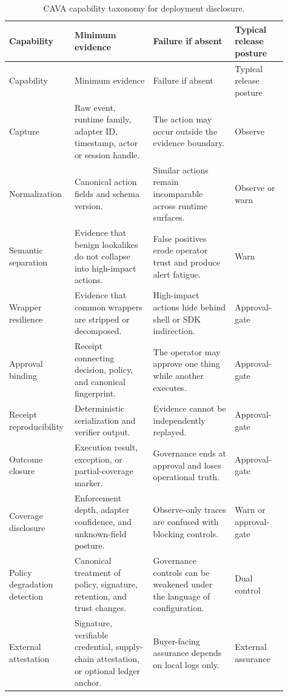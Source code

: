 \documentclass[11pt]{article}
\begin{document}
\begin{longtable}{@{}L{0.18\linewidth}L{0.27\linewidth}L{0.28\linewidth}L{0.18\linewidth}@{}}
\caption{CAVA capability taxonomy for deployment disclosure.}
\label{tab:capability-taxonomy}\\
\toprule
Capability & Minimum evidence & Failure if absent & Typical release posture \\
\midrule
\endfirsthead
\toprule
Capability & Minimum evidence & Failure if absent & Typical release posture \\
\midrule
\endhead
Capture & Raw event, runtime family, adapter ID, timestamp, actor or session handle. & The action may occur outside the evidence boundary. & Observe \\
Normalization & Canonical action fields and schema version. & Similar actions remain incomparable across runtime surfaces. & Observe or warn \\
Semantic separation & Evidence that benign lookalikes do not collapse into high-impact actions. & False positives erode operator trust and produce alert fatigue. & Warn \\
Wrapper resilience & Evidence that common wrappers are stripped or decomposed. & High-impact actions hide behind shell or SDK indirection. & Approval-gate \\
Approval binding & Receipt connecting decision, policy, and canonical fingerprint. & The operator may approve one thing while another executes. & Approval-gate \\
Receipt reproducibility & Deterministic serialization and verifier output. & Evidence cannot be independently replayed. & Approval-gate \\
Outcome closure & Execution result, exception, or partial-coverage marker. & Governance ends at approval and loses operational truth. & Approval-gate \\
Coverage disclosure & Enforcement depth, adapter confidence, and unknown-field posture. & Observe-only traces are confused with blocking controls. & Warn or approval-gate \\
Policy degradation detection & Canonical treatment of policy, signature, retention, and trust changes. & Governance controls can be weakened under the language of configuration. & Dual control \\
External attestation & Signature, verifiable credential, supply-chain attestation, or optional ledger anchor. & Buyer-facing assurance depends on local logs only. & External assurance \\
\bottomrule
\end{longtable}
\end{document}
